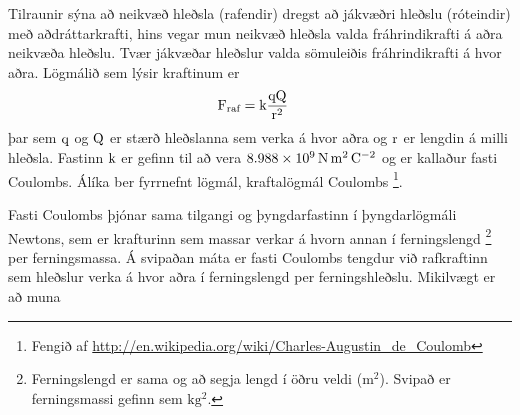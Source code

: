 Tilraunir sýna að neikvæð hleðsla (rafendir) dregst að jákvæðri hleðslu
(róteindir) með aðdráttarkrafti, hins vegar mun neikvæð hleðsla valda 
fráhrindikrafti á aðra neikvæða hleðslu. Tvær jákvæðar hleðslur valda 
sömuleiðis fráhrindikrafti á hvor aðra. Lögmálið sem lýsir kraftinum er
\begin{align}
	\textrm{F}_\text{raf} &= \text{k} \frac{\textrm{q} \textrm{Q}}{\textrm{r}^2}
\end{align}
þar sem $\textrm{q}$ og $\textrm{Q}$ er stærð hleðslanna sem verka á
hvor aðra og $\textrm{r}$ er lengdin á milli hleðsla. Fastinn $\text{k}$ er gefinn
til að vera $\num{8.988e9} \, \si{\newton\metre\squared\per\coulomb\squared}$ og er kallaður fasti Coulombs. Álíka ber
fyrrnefnt lögmál, kraftalögmál Coulombs%
\footnote{Fengið af 
\url{http://en.wikipedia.org/wiki/Charles-Augustin_de_Coulomb}}. %

Fasti Coulombs þjónar sama tilgangi og þyngdarfastinn í þyngdarlögmáli Newtons,
sem er krafturinn sem massar verkar á hvorn annan í ferningslengd%
\footnote{Ferningslengd er sama og að segja lengd í öðru veldi 
	($\si{\metre\squared}$). Svipað er ferningsmassi gefinn sem 
	$\si{\kilo\gram\squared}$.
	}
per
ferningsmassa. Á svipaðan máta er fasti Coulombs tengdur við rafkraftinn sem 
hleðslur verka á hvor aðra í ferningslengd per ferningshleðslu. Mikilvægt er að
muna 

